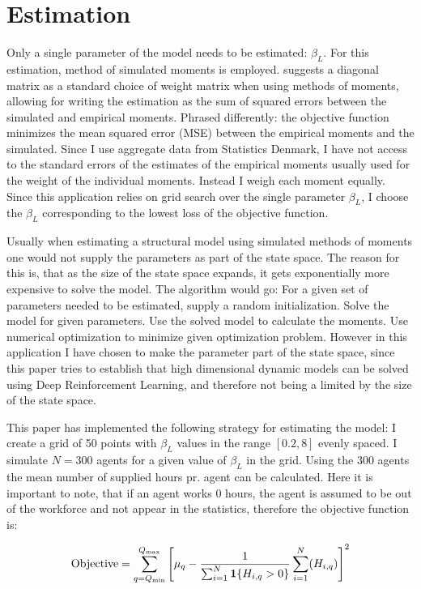 \section{Estimation}

Only a single parameter of the model needs to be estimated: $\beta_L$. For this estimation, method of simulated moments is employed.  \textcite{eisenhauer_estimation_2015} suggests a diagonal matrix as a standard choice of weight matrix when using methods of moments, allowing for writing the estimation as the sum of squared errors between the simulated and empirical moments. Phrased differently: the objective function minimizes the mean squared error (MSE) between the empirical moments and the simulated. Since I use aggregate data from Statistics Denmark, I have not access to the standard errors of the estimates of the empirical moments usually used for the weight of the individual moments. Instead I weigh each moment equally. Since this application relies on grid search over the single parameter $\beta_L$, I choose the $\beta_L$ corresponding to the lowest loss of the objective function. 

Usually when estimating a structural model using simulated methods of moments one would not supply the parameters as part of the state space. The reason for this is, that as the size of the state space expands, it gets exponentially more expensive to solve the model. The algorithm would go: For a given set of parameters needed to be estimated, supply a random initialization. Solve the model for given parameters. Use the solved model to calculate the moments. Use numerical optimization to minimize given optimization problem. However in this application I have chosen to make the parameter part of the state space, since this paper tries to establish that high dimensional dynamic models can be solved using Deep Reinforcement Learning, and therefore not being a limited by the size of the state space.

This paper has implemented the following strategy for estimating the model: I create a grid of 50 points with $\beta_L$ values in the range $[0.2, 8]$ evenly spaced. I simulate $N=300$ agents for a given value of $\beta_L$ in the grid. Using the 300 agents the mean number of supplied hours pr. agent can be calculated. Here it is important to note, that if an agent works 0 hours, the agent is assumed to be out of the workforce and not appear in the statistics, therefore the objective function is:

\begin{equation}
    \text{Objective} = \sum_{q=Q_{\min}}^{Q_{\max}} \left[ \mu_{q} -\frac{1}{\sum_{i=1}^{N} \mathbf{1}\{H_{i,q} > 0\}}\sum_{i=1}^N (H_{i,q})\right]^2
\end{equation}

